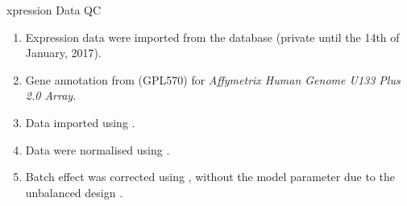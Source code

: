 \usepackage{tikz}



\maketitle
\usebackgroundtemplate{%
}
\begin{frame}{xpression Data QC}
\begin{enumerate}
    \item Expression data were imported from the  database (private until the 14th of January, 2017).
    \item Gene annotation from  (GPL570) for \textit{Affymetrix Human Genome U133 Plus 2.0 Array}.
    \item Data imported using \cmd{::} \citep{R_affy}.
    \item Data were normalised using \cmd{::} \citep{irizarry2003exploration}.
    \item Batch effect was corrected using \cmd{::} \citep{leek2012sva}, without the model parameter due to the unbalanced design \citep{nygaard2016methods}.
\end{enumerate}
\end{frame}

